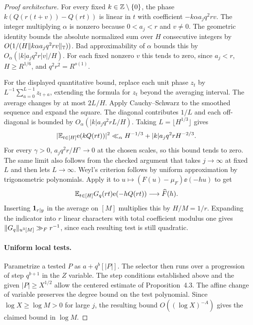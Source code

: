 \begin{proof}[Proof architecture]
For every fixed $k\in\mathbb Z\setminus\{0\}$, the phase
$k(Q(r(t+v))-Q(rt))$ is linear in $t$ with coefficient
$-k\alpha a_jq^2rv$. The integer multiplying $\alpha$ is nonzero because
$0<a_j<r$ and $v\ne0$. The geometric identity bounds the
absolute normalized sum over $H$ consecutive integers by
$O(1/(H\lVert k\alpha a_jq^2rv\rVert_{\mathbb T}))$.
Bad approximability of $\alpha$ bounds this by
$O_\alpha(|k|a_jq^2r |v|/H)$.
For each fixed nonzero $v$ this tends to zero, since
$a_j<r$, $H\ge R^{1/6}$, and $q^2r^2=R^{o(1)}$.

For the displayed quantitative bound, replace each unit phase $z_t$ by
$L^{-1}\sum_{a=0}^{L-1}z_{t+a}$, extending the formula for $z_t$
beyond the averaging interval. The average changes by at most
$2L/H$. Apply Cauchy--Schwarz to the smoothed sequence and expand
the square. The diagonal contributes $1/L$ and each off-diagonal
is bounded by $O_\alpha(|k|a_jq^2r L/H)$. Taking
$L=\lfloor H^{1/3}\rfloor$ gives
\[
 \lvert\mathbb E_{t\in[H]}\mathrm e(kQ(rt))\rvert^{2}
 \ll_\alpha H^{-1/3}+|k|a_jq^2rH^{-2/3}.
\]
For every $\gamma>0$, $a_jq^2r/H^\gamma\to0$ at the chosen
scales, so this bound tends to zero. The same limit also follows
from the checked argument that takes $j\to\infty$ at fixed $L$
and then lets $L\to\infty$. Weyl's criterion
follows by uniform approximation by trigonometric polynomials.
Apply it to $u\mapsto(F(u)-\mu_F)\ee(-hu)$ to get
\[
 \mathbb E_{t\in[H]}G_q(rt)\mathrm e(-hQ(rt))\longrightarrow \widehat F(h).
\]
Inserting $\mathbf 1_{r\mid y}$ in the average on $[M]$ multiplies this
by $H/M=1/r$. Expanding the indicator into $r$ linear characters
with total coefficient modulus one gives
$\lVert G_q\rVert_{u^3[M]}\gg_F r^{-1}$, since each resulting test is
still quadratic.

\paragraph{Uniform local tests.}
Parametrize a tested $P$ as $a+q^b[|P|]$. The selector then runs
over a progression of step $q^{b+1}$ in the $Z$ variable. The
step conditions established above and the given $|P|\ge X^{1/2}$
allow the centered estimate of Proposition~4.3. The affine change
of variable preserves the degree bound on the test polynomial.
Since $\log X\ge\log M>0$ for large $j$, the resulting bound
$O((\log X)^{-A})$ gives the claimed bound in $\log M$.


\end{proof}
